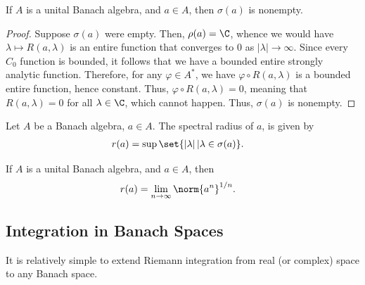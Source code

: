 \documentclass[10pt]{mypackage}
\begin{document}
\begin{theorem}
  If $A$ is a unital Banach algebra, and $a\in A$, then $\sigma(a)$ is nonempty.
\end{theorem}
\begin{proof}
  Suppose $\sigma(a)$ were empty. Then, $\rho(a) = \C$, whence we would have $\lambda\mapsto R\left( a,\lambda \right)$ is an entire function that converges to $0$ as $\left\vert \lambda \right\vert\rightarrow\infty$. Since every $C_0$ function is bounded, it follows that we have a bounded entire strongly analytic function. Therefore, for any $\varphi\in A^{\ast}$, we have $\varphi\circ R\left( a,\lambda \right)$ is a bounded entire function, hence constant. Thus, $\varphi\circ R\left( a,\lambda \right) = 0$, meaning that $R\left( a,\lambda \right) = 0$ for all $\lambda\in \C$, which cannot happen. Thus, $\sigma(a)$ is nonempty.
\end{proof}
\begin{definition}
  Let $A$ be a Banach algebra, $a\in A$. The spectral radius of $a$, is given by
  \begin{align*}
    r(a) &= \sup\set{\left\vert \lambda \right\vert | \lambda\in \sigma(a)}.
  \end{align*}
\end{definition}
\begin{theorem}
  If $A$ is a unital Banach algebra, and $a\in A$, then
  \begin{align*}
    r(a) &= \lim_{n\rightarrow\infty}\norm{a^{n}}^{1/n}.
  \end{align*}
\end{theorem}
\subsection{Integration in Banach Spaces}%
It is relatively simple to extend Riemann integration from real (or complex) space to any Banach space.
\end{document}
